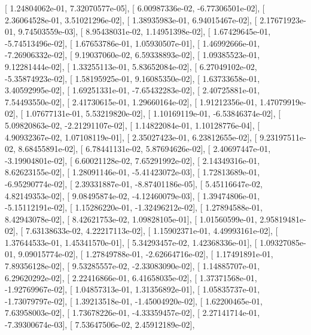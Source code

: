 \documentclass{article}
\begin{document}
       [  1.24804062e-01,   7.32070577e-05],
       [  6.00987336e-02,  -6.77306501e-02],
       [  2.36064528e-01,   3.51021296e-02],
       [  1.38935983e-01,   6.94015467e-02],
       [  2.17671923e-01,   9.74503559e-03],
       [  8.95438031e-02,   1.14951398e-02],
       [  1.67429645e-01,  -5.74513496e-02],
       [  1.67653786e-01,   1.05930507e-01],
       [  1.46992666e-01,  -7.26906332e-02],
       [  9.19037060e-02,   6.59338893e-02],
       [  1.09385523e-01,   9.12281444e-02],
       [  1.33255113e-01,   5.83652084e-02],
       [  6.27049102e-02,  -5.35874923e-02],
       [  1.58195925e-01,   9.16085350e-02],
       [  1.63733658e-01,   3.40592995e-02],
       [  1.69251331e-01,  -7.65432283e-02],
       [  2.40725881e-01,   7.54493550e-02],
       [  2.41730615e-01,   1.29660164e-02],
       [  1.91212356e-01,   1.47079919e-02],
       [  1.07677131e-01,   5.53219820e-02],
       [  1.10169119e-01,  -6.53846374e-02],
       [  5.09820863e-02,  -2.21291107e-02],
       [  1.14822084e-01,   1.10128776e-04],
       [  4.90932367e-02,   1.07108119e-01],
       [  2.35027423e-01,   6.23812655e-02],
       [  9.23197511e-02,   8.68455891e-02],
       [  6.78441131e-02,   5.87694626e-02],
       [  2.40697447e-01,  -3.19904801e-02],
       [  6.60021128e-02,   7.65291992e-02],
       [  2.14349316e-01,   8.62623155e-02],
       [  1.28091146e-01,  -5.41423072e-03],
       [  1.72813689e-01,  -6.95290774e-02],
       [  2.39331887e-01,  -8.87401186e-05],
       [  5.45116647e-02,   4.82149353e-02],
       [  9.08495874e-02,  -4.12460079e-03],
       [  1.39474806e-01,  -5.15112191e-02],
       [  1.15286220e-01,  -1.32496212e-02],
       [  1.27894588e-01,   8.42943078e-02],
       [  8.42621753e-02,   1.09828105e-01],
       [  1.01560599e-01,   2.95819481e-02],
       [  7.63138633e-02,   4.22217113e-02],
       [  1.15902371e-01,   4.49993161e-02],
       [  1.37644533e-01,   1.45341570e-01],
       [  5.34293457e-02,   1.42368336e-01],
       [  1.09327085e-01,   9.09015774e-02],
       [  1.27849788e-01,  -2.62664716e-02],
       [  1.17491891e-01,   7.89356128e-02],
       [  9.53285557e-02,  -2.33083090e-02],
       [  1.14885707e-01,   6.29620292e-02],
       [  2.22416866e-01,   6.41658035e-02],
       [  1.37371568e-01,  -1.92769967e-02],
       [  1.04857313e-01,   1.31356892e-01],
       [  1.05835737e-01,  -1.73079797e-02],
       [  1.39213518e-01,  -1.45004920e-02],
       [  1.62200465e-01,   7.63958003e-02],
       [  1.73678226e-01,  -4.33359457e-02],
       [  2.27141714e-01,  -7.39300674e-03],
       [  7.53647506e-02,   2.45912189e-02],
\end{document}

